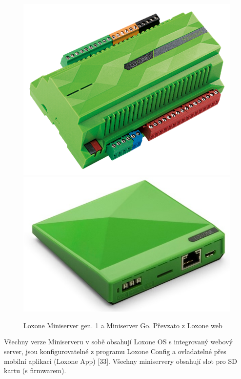 \begin{figure}[hbt]
	\centering
	\includegraphics{obrazky/loxone-miniserver.png}
	\includegraphics{obrazky/loxone-miniserver-go.jpg}
	\caption{Loxone Miniserver gen. 1 a Miniserver Go. Převzato z Loxone web}
	\label{miniserver}
\end{figure}


Všechny verze Miniserveru v sobě obsahují Loxone OS s integrovaný webový server, jsou konfigurovatelné z programu Loxone Config a ovladatelné přes mobilní aplikaci (Loxone App) [33]. Všechny miniservery obsahují slot pro SD kartu (s firmwarem). 

